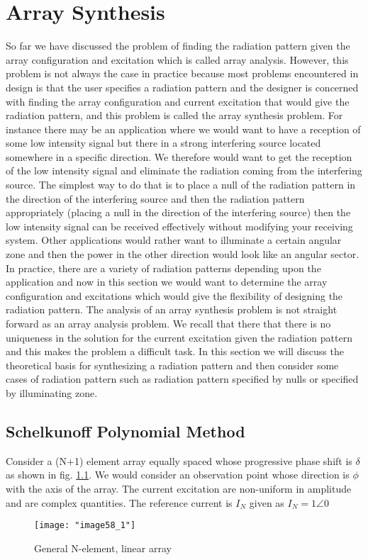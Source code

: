 	\chapter{Array Synthesis}
	So far we have discussed the problem of finding the radiation pattern given the array configuration and excitation which is called array analysis. However, this problem is not always the case in practice because most problems encountered in design is that the user specifies a radiation pattern and the designer is concerned with finding the array configuration and current excitation that would give the radiation pattern, and this problem is called the array synthesis problem. For instance there may be an application  where we would want to have a reception of some low intensity signal but there in a strong interfering source located somewhere in a specific direction. We therefore would want to get the reception of the low intensity signal and eliminate the radiation coming from the interfering source. The simplest way to do that is to place a null of the radiation pattern in the direction of the interfering source and then the radiation pattern appropriately (placing a null in the direction of the interfering source) then the low intensity signal can be received effectively without modifying your receiving system. Other applications would rather want to illuminate a certain angular zone and then the power in the other direction would look like an angular sector. In practice, there are a variety of radiation patterns depending upon the application and now in this section we would want to determine the array configuration and excitations which would give the flexibility of designing the radiation pattern.
	The analysis of an array synthesis problem is not straight forward as an array analysis problem. We recall that there that there is no uniqueness in the solution for the current excitation given the radiation pattern and this makes the problem a difficult task. In this section we will discuss the theoretical basis for synthesizing a radiation pattern and then consider some cases of radiation pattern such as radiation pattern specified by nulls or specified by illuminating zone.
	\section{Schelkunoff Polynomial Method}
	Consider a (N+1) element array equally spaced whose progressive phase shift is $\delta$ as shown in fig. \ref{fig:fig 55_1}. We would consider an observation point whose direction is $\phi$ with the axis of the array. The current excitation are non-uniform in amplitude and are complex quantities. The reference current is $I_{N}$ given as $I_{N}=1\angle 0$
	 	\begin{figure}[H]
	 	\centering
	 	\texttt{[image: "image58\_1"]}
	 	\caption{ General N-element, linear array}
	 	\label{fig:fig 55_1}
	 \end{figure}
	
